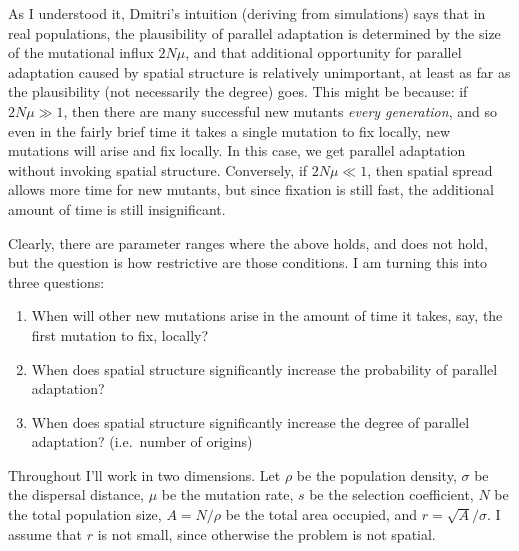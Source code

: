 \documentclass{article}
\begin{document}
As I understood it, Dmitri's intuition (deriving from simulations) says that
in real populations, the plausibility of parallel adaptation 
is determined by the size of the mutational influx $2N\mu$,
and that additional opportunity for parallel adaptation caused by spatial structure is relatively unimportant,
at least as far as the plausibility (not necessarily the degree) goes.
This might be because: if $2N\mu \gg 1$,
then there are many successful new mutants {\em every generation},
and so even in the fairly brief time it takes a single mutation to fix locally,
new mutations will arise and fix locally.
In this case, we get parallel adaptation without invoking spatial structure.
Conversely, if $2N\mu \ll 1$,
then spatial spread allows more time for new mutants, 
but since fixation is still fast, the additional amount of time is still insignificant.

Clearly, there are parameter ranges where the above holds, and does not hold,
but the question is how restrictive are those conditions.
I am turning this into three questions:
\begin{enumerate}
  \item When will other new mutations arise in the amount of time it takes, say, the first mutation to fix, locally?
  \item When does spatial structure significantly increase the probability of parallel adaptation?  
  \item When does spatial structure significantly increase the degree of parallel adaptation? 
    (i.e.\ number of origins)
\end{enumerate}
Throughout I'll work in two dimensions.
Let $\rho$ be the population density, 
$\sigma$ be the dispersal distance, 
$\mu$ be the mutation rate,
$s$ be the selection coefficient,
$N$ be the total population size,
$A=N/\rho$ be the total area occupied,
and $r = \sqrt{A}/\sigma$.
I assume that $r$ is not small, since otherwise the problem is not spatial.
\end{document}
